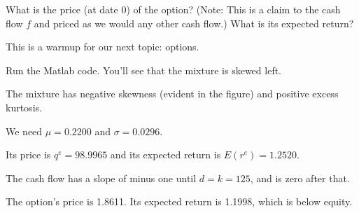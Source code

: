 \documentclass[11pt]{exam}
\begin{document}
\begin{questions}
\begin{parts}
\item What is the price (at date 0) of the option?
(Note:  This is a claim to the cash flow $f$ and priced
as we would any other cash flow.)
What is its expected return?
\end{parts}

\begin{solution}
This is a warmup for our next topic:  options.
\begin{parts}
\item Run the Matlab code.
You'll see that the mixture is skewed left.

\item The mixture has negative skewness (evident in the figure)
and positive excess kurtosis.

\item We need $\mu = 0.2200$ and $\sigma = 0.0296$.

\item Its price is $q^e = 98.9965$ and its expected return is $ E(r^e) = 1.2520 $.

\item The cash flow has a slope of minus one until $d=k = 125$,
and is zero after that.

\item The option's price is 1.8611.
Its expected return is 1.1998, which is below equity.

\end{parts}
\end{solution}

\end{questions}


\end{document}
